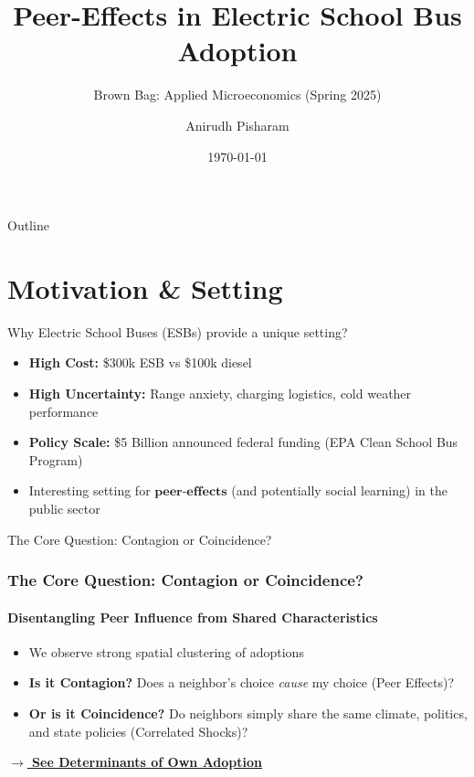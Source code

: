 \documentclass[10pt]{beamer}
\title{Peer-Effects in Electric School Bus Adoption}
\subtitle{Brown Bag: Applied Microeconomics (Spring 2025)}
\author{Anirudh Pisharam}
\institute{Department of Economics}
\date{\today}
\begin{document}
\maketitle

\begin{frame}{Outline}
  \tableofcontents
\end{frame}

\section{Motivation \& Setting}

\begin{frame}{Why Electric School Buses (ESBs) provide a unique setting?}

  \begin{itemize}
    \item \textbf{High Cost:} \$300k ESB vs \$100k diesel
    \item \textbf{High Uncertainty:} Range anxiety, charging logistics, cold weather performance
    \item \textbf{Policy Scale:} \alert{\$5 Billion} announced federal funding (EPA Clean School Bus Program)
    \item Interesting setting for $\textbf{peer-effects}$ (and potentially \alert{social learning}) in the public sector
  \end{itemize}
\end{frame}

\begin{frame}[label=core_question]{The Core Question: Contagion or Coincidence?}
  \frametitle{The Core Question: Contagion or Coincidence?}
  \framesubtitle{Disentangling Peer Influence from Shared Characteristics}

  \begin{itemize}
    \item We observe strong spatial clustering of adoptions
    \item \textbf{Is it Contagion?} Does a neighbor's choice \textit{cause} my choice (Peer Effects)?
    \item \textbf{Or is it Coincidence?} Do neighbors simply share the same climate, politics, and state policies (Correlated Shocks)?
  \end{itemize}
  
  \vspace{1em}
  \hyperlink{backup_own_adoption}{\textbf{\color{mLightBrown} $\rightarrow$ See Determinants of Own Adoption}}
\end{frame}
\end{document}
